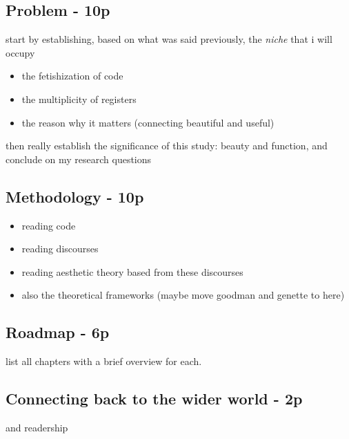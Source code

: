 \subsection{Problem - 10p}

start by establishing, based on what was said previously, the \emph{niche} that i will occupy

\begin{itemize}
    \item the fetishization of code
    \item the multiplicity of registers
    \item the reason why it matters (connecting beautiful and useful)
\end{itemize}

then really establish the significance of this study: beauty and function, and conclude on my research questions

\subsection{Methodology - 10p}

\begin{itemize}
    \item reading code
    \item reading discourses
    \item reading aesthetic theory based from these discourses
    \item also the theoretical frameworks (maybe move goodman and genette to here)
\end{itemize}

\subsection{Roadmap - 6p}

list all chapters with a brief overview for each.

\subsection{Connecting back to the wider world - 2p}

and readership